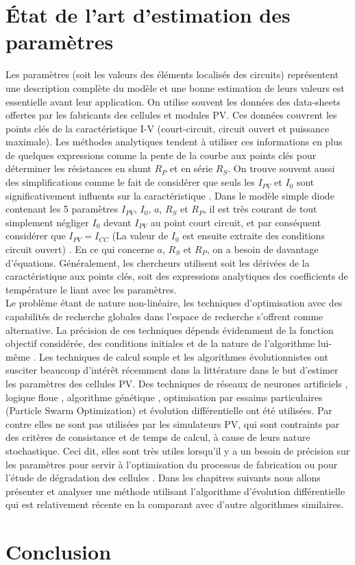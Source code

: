 \section{État de l'art d'estimation des paramètres}

Les paramètres (soit les valeurs des éléments localisés des circuits) représentent une description complète du modèle et une bonne estimation de leurs valeurs est essentielle avant leur application. On utilise souvent les données des data-sheets offertes par les fabricants des cellules et modules PV. Ces données couvrent les points clés de la caractéristique I-V (court-circuit, circuit ouvert et puissance maximale). Les méthodes analytiques tendent à utiliser ces informations en plus de quelques expressions comme la pente de la courbe aux points clés pour déterminer les résistances en shunt $R_P$ et en série $R_S$. On trouve souvent aussi des simplifications comme le fait de considérer que seuls les $I_{PV}$ et $I_0$ sont significativement influents sur la caractéristique \cite{Ciulla2014}.
Dans le modèle simple diode contenant les 5 paramètres $I_{PV}$, $I_0$, $a$, $R_S$ et $R_P$, il est très courant de tout simplement négliger $I_0$ devant $I_{PV}$ au point court circuit, et par conséquent considérer que $I_{PV} = I_{CC}$ (La valeur de $I_0$ est ensuite extraite des conditions circuit ouvert) \cite{Villalva2009,Ciulla2014,Tsai2008}. En ce qui concerne $a$, $R_S$ et $R_P$, on a besoin de davantage d'équations. Généralement, les chercheurs utilisent soit les dérivées de la caractéristique aux points clés, soit des expressions analytiques des coefficients de température le liant avec les paramètres.\\
Le problème étant de nature non-linéaire, les techniques d'optimisation avec des capabilités de recherche globales dans l'espace de recherche s'offrent comme alternative. La précision de ces techniques dépends évidemment de la fonction objectif considérée, des conditions initiales et de la nature de l'algorithme lui-même \cite{Easwarakhanthan1986b, El-Naggar2012, DaCosta2010}. Les techniques de calcul souple et les algorithmes évolutionnistes ont susciter beaucoup d'intérêt récemment dans la littérature dans le but d'estimer les paramètres des cellules PV. Des techniques de réseaux de neurones artificiels \cite{Balzani2005, Zhang2005a, Karatepe2006}, logique floue \cite{Elhagry1997, Bendib2013, AbdulHadi2004}, algorithme génétique \cite{Jervase2001, Moldovan2009, Ismail2013}, optimisation par essaims particulaires (Particle Swarm Optimization) \cite{Ye2009, Soon2012} et évolution différentielle \cite{DaCosta2010, Ishaque2012, Gong2013} ont été utilisées. Par contre elles ne sont pas utilisées par les simulateurs PV, qui sont contraints par des critères de consistance et de temps de calcul, à cause de leurs nature stochastique. Ceci dit, elles sont très utiles lorsqu'il y a un besoin de précision sur les paramètres pour servir à l'optimisation du processus de fabrication ou pour l'étude de dégradation des cellules \cite{Ikegami2001,Balzani2005}. Dans les chapitres suivants nous allons présenter et analyser une méthode utilisant l'algorithme d'évolution différentielle qui est relativement récente en la comparant avec d'autre algorithmes similaires.

\section{Conclusion}
